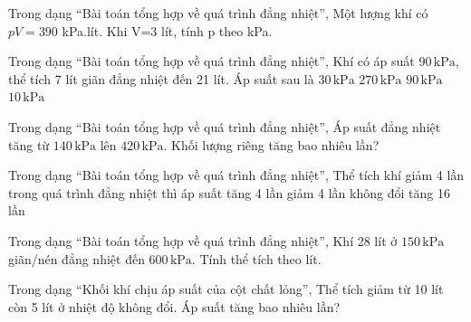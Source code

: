 \begin{ex}
Trong dạng “Bài toán tổng hợp về quá trình đẳng nhiệt”, Một lượng khí có $pV=390$ kPa.lít. Khi V=3 lít, tính p theo kPa.
\end{ex}

\begin{ex}
Trong dạng “Bài toán tổng hợp về quá trình đẳng nhiệt”, Khí có áp suất $90\,\text{kPa}$, thể tích 7 lít giãn đẳng nhiệt đến 21 lít. Áp suất sau là
\choice
{\True $30\,\text{kPa}$}
{$270\,\text{kPa}$}
{$90\,\text{kPa}$}
{$10\,\text{kPa}$}
\end{ex}

\begin{ex}
Trong dạng “Bài toán tổng hợp về quá trình đẳng nhiệt”, Áp suất đẳng nhiệt tăng từ $140\,\text{kPa}$ lên $420\,\text{kPa}$. Khối lượng riêng tăng bao nhiêu lần?
\end{ex}

\begin{ex}
Trong dạng “Bài toán tổng hợp về quá trình đẳng nhiệt”, Thể tích khí giảm 4 lần trong quá trình đẳng nhiệt thì áp suất
\choice
{\True tăng 4 lần}
{giảm 4 lần}
{không đổi}
{tăng 16 lần}
\end{ex}

\begin{ex}
Trong dạng “Bài toán tổng hợp về quá trình đẳng nhiệt”, Khí 28 lít ở $150\,\text{kPa}$ giãn/nén đẳng nhiệt đến $600\,\text{kPa}$. Tính thể tích theo lít.
\end{ex}

\begin{bt}
Trong dạng “Khối khí chịu áp suất của cột chất lỏng”, Thể tích giảm từ 10 lít còn 5 lít ở nhiệt độ không đổi. Áp suất tăng bao nhiêu lần?
\end{bt}

